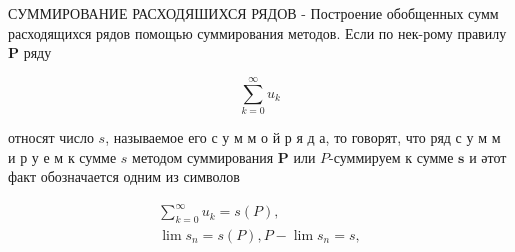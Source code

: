\documentclass[10pt]{article}
\begin{document}
СУММИРОВАНИЕ РАСХОДЯШИХСЯ РЯДОВ - Построение обобщенных сумм расходящихся рядов помощью суммирования методов. Если по нек-рому правилу $\boldsymbol{P}$ ряду



\[

\sum_{k=0}^{\infty} u_{k}

\]



относят число $s$, называемое его с у м м о й р я д а, то говорят, что ряд с у м м и р у е м к сумме $s$ методом суммирования $\boldsymbol{P}$ или $P$-суммируем к сумме $\boldsymbol{s}$ и әтот факт обозначается одним из символов



\[

\begin{gathered}

\sum_{k=0}^{\infty} u_{k}=s(P), \\

\lim s_{n}=s(P), P-\lim s_{n}=s,

\end{gathered}

\]
\end{document}
